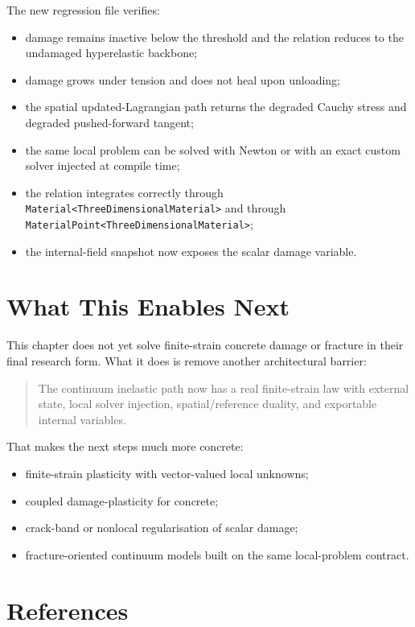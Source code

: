 The new regression file verifies:
\begin{itemize}
  \item damage remains inactive below the threshold and the relation reduces to
        the undamaged hyperelastic backbone;
  \item damage grows under tension and does not heal upon unloading;
  \item the spatial updated-Lagrangian path returns the degraded Cauchy stress
        and degraded pushed-forward tangent;
  \item the same local problem can be solved with Newton or with an exact
        custom solver injected at compile time;
  \item the relation integrates correctly through
        \texttt{Material<ThreeDimensionalMaterial>} and through
        \texttt{MaterialPoint<ThreeDimensionalMaterial>};
  \item the internal-field snapshot now exposes the scalar damage variable.
\end{itemize}

\section{What This Enables Next}

This chapter does not yet solve finite-strain concrete damage or fracture in
their final research form.  What it does is remove another architectural
barrier:
\begin{quote}
The continuum inelastic path now has a real finite-strain law with external
state, local solver injection, spatial/reference duality, and exportable
internal variables.
\end{quote}

That makes the next steps much more concrete:
\begin{itemize}
  \item finite-strain plasticity with vector-valued local unknowns;
  \item coupled damage-plasticity for concrete;
  \item crack-band or nonlocal regularisation of scalar damage;
  \item fracture-oriented continuum models built on the same local-problem
        contract.
\end{itemize}

\section{References}

